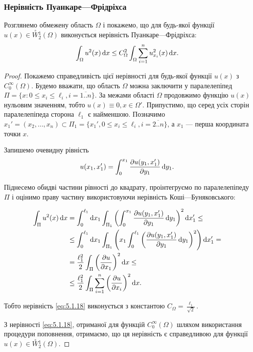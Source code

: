 \subsubsection{Нерівність Пуанкаре---Фрідріхса}

\begin{proposition}
    Розглянемо обмежену область $\Omega$ і покажемо, що для будь-якої функції $u(x) \in \overset{\circ}{W} {}_2^1(\Omega)$ виконується нерівність Пуанкаре---Фрідріхса:
    \begin{equation}
        \label{eq:5.1.18}
        \int_\Omega u^2(x) \mathop{}\!\mathrm{d} x \le C_\Omega^2 \int_\Omega \sum_{i = 1}^n u_{x_i}^2(x) \mathop{}\!\mathrm{d} x.
    \end{equation}
\end{proposition}

\begin{proof}
    Покажемо справедливість цієї нерівності для будь-якої функції $u(x)$ з $C_0^\infty(\Omega)$. Будемо вважати, що область $\Omega$ можна заключити у паралелепіпед $\Pi = \{x: 0 \le x_i \le \ell_i, i = \overline{1..n}\}$. За межами області $\Omega$ продовжимо функцію $u(x)$ нульовим значенням, тобто $u(x) \equiv 0, x \in \Omega'$. Припустимо, що серед усіх сторін паралелепіпеда сторона $\ell_1$ є найменшою. Позначимо $x_1' = (x_2, \ldots, x_n) \subset \Pi_1 = \{x_1', 0 \le x_i \le \ell_i, i = \overline{2..n}\}$, а $x_1$ --- перша координата точки $x$. \medskip

    Запишемо очевидну рівність
    \begin{equation*}
        u(x_1, x_1') = \int_0^{x_1} \frac{\partial u(y_1, x_1')}{\partial y_1} \mathop{}\!\mathrm{d} y_1.
    \end{equation*}

    Піднесемо обидві частини рівності до квадрату, проінтегруємо по паралелепіпеду $\Pi$ і оцінимо праву частину використовуючи нерівність Коші---Буняковського:

    \begin{align*}
        \int_\Pi u^2(x) \diff x
        &= \int_0^{\ell_1} \diff x_1 \int_{\Pi_1} \left( \int_0^{x_1} \frac{\partial u(y_1, x_1')}{\partial y_1} \diff y_1 \right)^2 \diff x_1' \le \\
        &\le \int_0^{\ell_1} \diff x_1 \int_{\Pi_1} \left(  x_1 \int_0^{\ell_1} \left( \frac{\partial u(y_1, x_1')}{\partial y_1} \diff y_1 \right)^2 \right) \diff x_1' = \\
        &= \frac{\ell_1^2}{2} \int_\Pi \left( \frac{\partial u}{\partial x_1} \right)^2 \diff x \le \\
        &\le \frac{\ell_1^2}{2} \int_{\Pi} \sum_{i = 1}^n \left( \frac{\partial u}{\partial x_i} \right)^2 \diff x.
    \end{align*}

    Тобто нерівність \eqref{eq:5.1.18} виконується з константою $C_\Omega = \frac{\ell_1}{\sqrt{2}}$. \medskip

    З нерівності \eqref{eq:5.1.18}, отриманої для функцій $C_0^\infty(\Omega)$ шляхом використання процедури поповнення, отримаємо, що ця нерівність є справедливою для функції $u(x) \in \overset{\circ}{W} {}_2^1(\Omega)$.
\end{proof}

